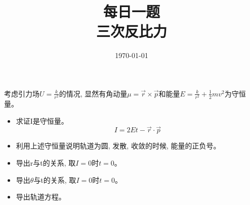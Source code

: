 \documentclass{ctexart}
\title {每日一题 \\ {\small 三次反比力}}
\date{\today}
\begin{document}
    \maketitle{}



    考虑引力场\(U = \frac{k}{r^2}\)的情况, 显然有角动量\(\mu = \vec{r} \times \vec{p} \)和能量\(E = \frac{k}{r^2} + \frac{1}{2}m v^2 \)为守恒量。
    \begin{itemize}
        \item 求证I是守恒量。
            \begin{equation}
                I = 2Et - \vec{r} \cdot \vec{p}
            \end{equation}
        \item 利用上述守恒量说明轨道为圆, 发散, 收敛的时候, 能量的正负号。
        \item 导出r与t的关系, 取\(I=0\)时\(t=0\)。
        \item 导出\(\theta\)与t的关系, 取\(I=0\)时\(t=0\)。
        \item 导出轨道方程。
    \end{itemize}
    
\end{document}
